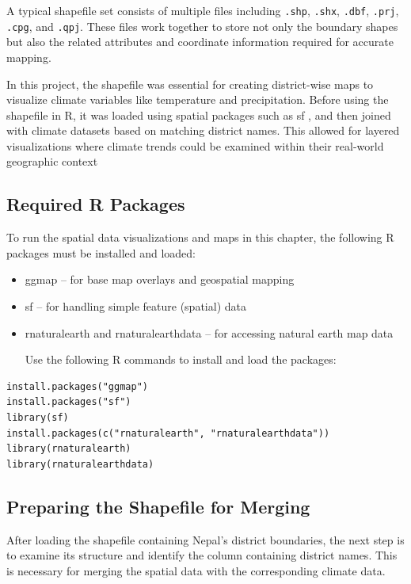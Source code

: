 A typical shapefile set consists of multiple files including \texttt{.shp}, \texttt{.shx}, \texttt{.dbf}, \texttt{.prj}, \texttt{.cpg}, and \texttt{.qpj}.  These files work together to store not only the boundary shapes but also the related attributes and coordinate information required for accurate mapping.

In this project, the shapefile was essential for creating district-wise maps to visualize climate variables like temperature and precipitation. Before using the shapefile in R, it was loaded using spatial packages such as sf , and then joined with climate datasets based on matching district names. This allowed for layered visualizations where climate trends could be examined within their real-world geographic context


\subsection*{Required R Packages}

To run the spatial data visualizations and maps in this chapter, the following R packages must be installed and loaded:
\begin{itemize}
  \item ggmap – for base map overlays and geospatial mapping
  \item sf – for handling simple feature (spatial) data 
  \item rnaturalearth and rnaturalearthdata – for accessing natural earth map data

Use the following R commands to install and load the packages:

\end{itemize}
\begin{verbatim}
install.packages("ggmap")
install.packages("sf")
library(sf)
install.packages(c("rnaturalearth", "rnaturalearthdata"))
library(rnaturalearth)
library(rnaturalearthdata)
\end{verbatim}

\subsection*{Preparing the Shapefile for Merging}

After loading the shapefile containing Nepal’s district boundaries, the next step is to examine its structure and identify the column containing district names. This is necessary for merging the spatial data with the corresponding climate data.

